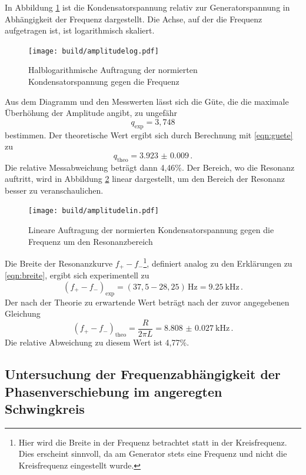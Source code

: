 In Abbildung \ref{fig:amplitudelog} ist die Kondensatorspannung relativ
zur Generatorspannung in Abhängigkeit der Frequenz dargestellt. Die Achse, auf der
die Frequenz aufgetragen ist, ist logarithmisch skaliert.

\begin{figure}
  \centering
  \texttt{[image: build/amplitudelog.pdf]}
  \caption{Halblogarithmische Auftragung der normierten Kondensatorspannung gegen die Frequenz}
  \label{fig:amplitudelog}
\end{figure}

Aus dem Diagramm und den Messwerten lässt sich die Güte, die die maximale
Überhöhung der Amplitude angibt, zu ungefähr
\begin{equation*}
  q_\text{exp} = 3,748
\end{equation*}
bestimmen. Der theoretische Wert ergibt sich durch Berechnung mit \eqref{eqn:guete}
zu
\begin{equation*}
  q_\text{theo} = \SI{3.923(0009)}\,.
\end{equation*}
Die relative Messabweichung beträgt dann 4,46\%.
Der Bereich, wo die Resonanz auftritt, wird in Abbildung \ref{fig:amplitudelin}
linear dargestellt, um den Bereich der Resonanz besser zu veranschaulichen.

\begin{figure}
  \centering
  \texttt{[image: build/amplitudelin.pdf]}
  \caption{Lineare Auftragung der normierten Kondensatorspannung gegen die Frequenz um den Resonanzbereich}
  \label{fig:amplitudelin}
\end{figure}

Die Breite der Resonanzkurve $f_{+} - f_{-}$\footnote{Hier wird die Breite in der
Frequenz betrachtet statt in der Kreisfrequenz. Dies erscheint sinnvoll, da am
Generator stets eine Frequenz und nicht die Kreisfrequenz eingestellt wurde.},
definiert analog zu den Erklärungen zu \eqref{eqn:breite}, ergibt sich experimentell zu
\begin{equation*}
  (f_{+} - f_{-})_\text{exp} = (37,5-28,25)\,\text{Hz} = \SI{9.25}{\kilo\hertz}\,.
\end{equation*}
Der nach der Theorie zu erwartende Wert beträgt nach der zuvor angegebenen Gleichung
\begin{equation*}
  (f_{+} - f_{-})_\text{theo} = \frac{R}{2\pi L} = \SI{8.808(27)}{\kilo\hertz}\,.
\end{equation*}
Die relative Abweichung zu diesem Wert ist 4,77\%.

\subsection{Untersuchung der Frequenzabhängigkeit der Phasenverschiebung im angeregten Schwingkreis}

